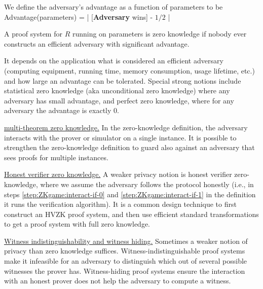 We define the adversary’s advantage as a function of parameters to be \newline
\hphantom{We define the } Advantage(parameters) = | [\textbf{Adversary} wins] - $1/2$ |
 
A proof system for $R$ running on parameters is zero knowledge if nobody ever constructs an efficient adversary with significant advantage.
 
It depends on the application what is considered an efficient adversary (computing equipment, running time, memory consumption, usage lifetime, etc.) and how large an advantage can be tolerated. 
Special strong notions include statistical zero knowledge (aka unconditional zero knowledge) where any adversary has small advantage, and perfect zero knowledge, where for any adversary the advantage is exactly 0.



\underline{multi-theorem zero knowledge.} 
In the zero-knowledge definition, the adversary interacts with the prover or simulator on a single instance. 
It is possible to strengthen the zero-knowledge definition to guard also against an adversary that sees proofs for multiple instances.
 
\underline{Honest verifier zero knowledge.} 
	A weaker privacy notion is honest verifier zero-knowledge, where we assume the adversary follows the protocol honestly 
(i.e., in steps \ref{step:ZKgame:interact-if-0} and \ref{step:ZKgame:interact-if-1} in the definition it runs the verification algorithm). 
	It is a common design technique to first construct an HVZK proof system, and then use efficient standard transformations to get a proof system with full zero knowledge.
 
\underline{Witness indistinguishability and witness hiding.} 
Sometimes a weaker notion of privacy than zero knowledge suffices. 
Witness-indistinguishable proof systems make it infeasible for an adversary to distinguish which out of several possible witnesses the prover has. Witness-hiding proof systems ensure the interaction with an honest prover does not help the adversary to compute a witness.


